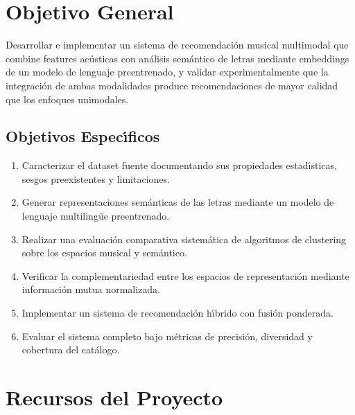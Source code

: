 \section{Objetivo General}
\label{sec:objetivo-general}

Desarrollar e implementar un sistema de recomendaci\'{o}n musical multimodal que combine features ac\'{u}sticas con an\'{a}lisis sem\'{a}ntico de letras mediante embeddings de un modelo de lenguaje preentrenado, y validar experimentalmente que la integraci\'{o}n de ambas modalidades produce recomendaciones de mayor calidad que los enfoques unimodales.

\subsection{Objetivos Espec\'{\i}ficos}
\label{sec:objetivos-especificos}

\begin{enumerate}
    \item Caracterizar el dataset fuente documentando sus propiedades estad\'{\i}sticas, sesgos preexistentes y limitaciones.

    \item Generar representaciones sem\'{a}nticas de las letras mediante un modelo de lenguaje multiling\"{u}e preentrenado.

    \item Realizar una evaluaci\'{o}n comparativa sistem\'{a}tica de algoritmos de clustering sobre los espacios musical y sem\'{a}ntico.

    \item Verificar la complementariedad entre los espacios de representaci\'{o}n mediante informaci\'{o}n mutua normalizada.

    \item Implementar un sistema de recomendaci\'{o}n h\'{\i}brido con fusi\'{o}n ponderada.

    \item Evaluar el sistema completo bajo m\'{e}tricas de precisi\'{o}n, diversidad y cobertura del cat\'{a}logo.
\end{enumerate}

\section{Recursos del Proyecto}
\label{sec:recursos}

